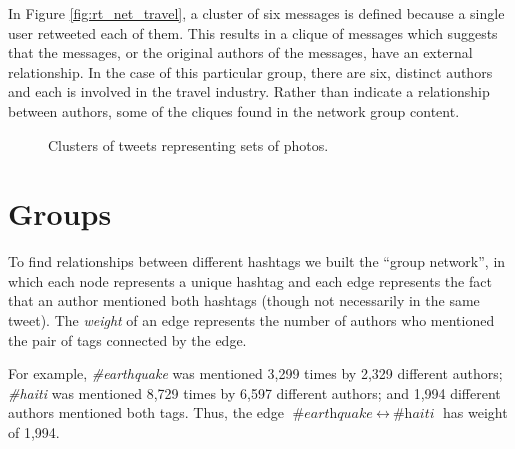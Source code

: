 \documentclass[a4paper, 11pt, titlepage]{article}
\begin{document}
In Figure \ref{fig:rt_net_travel}, a cluster of six messages is defined because a single user retweeted each of them.  This results in a clique of messages which suggests that the messages, or the original authors of the messages, have an external relationship.  In the case of this particular group, there are six, distinct authors and each is involved in the travel industry.  Rather than indicate a relationship between authors, some of the cliques found in the network group content.

\begin{figure}[h]
\centering
{}
\quad
{}
\caption{Clusters of tweets representing sets of photos.}
\label{fig:rt_net_photos}
\end{figure}

\section{Groups}

To find relationships between different hashtags we built the ``group network'', in which each node represents a unique hashtag and each edge represents the fact that an author mentioned both hashtags (though not necessarily in the same tweet). The \textit{weight} of an edge represents the number of authors who mentioned the pair of tags connected by the edge. 

For example, \textit{\#earthquake} was mentioned 3,299 times by 2,329 different authors; \textit{\#haiti} was mentioned 8,729 times by 6,597 different authors; and 1,994 different authors mentioned both tags. Thus, the edge $\textit{\#earthquake}~\leftrightarrow~\textit{\#haiti}$ has weight of 1,994.
\end{document}
